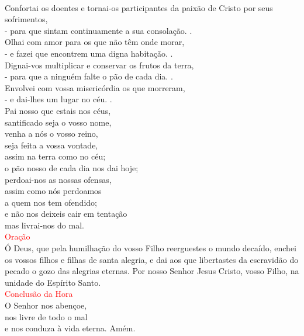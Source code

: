 \documentclass{book}
\begin{document}
\begin{center}
    \vspace{.2cm} \\
    Confortai os doentes e tornai-os participantes da paixão de Cristo por seus sofrimentos, \\
    - para que sintam continuamente a sua consolação. {\color{red} \Rbar.}
    \vspace{.2cm} \\
    Olhai com amor para os que não têm onde morar, \\
    - e fazei que encontrem uma digna habitação. {\color{red} \Rbar.}
    \vspace{.2cm} \\
    Dignai-vos multiplicar e conservar os frutos da terra, \\
    - para que a ninguém falte o pão de cada dia. {\color{red} \Rbar.}
    \vspace{.2cm} \\
    Envolvei com vossa misericórdia os que morreram, \\
    - e dai-lhes um lugar no céu. {\color{red} \Rbar.}
    \vspace{.2cm} \\
    Pai nosso que estais nos céus, \\
    santificado seja o vosso nome, \\
    venha a nós o vosso reino, \\
    seja feita a vossa vontade, \\
    assim na terra como no céu; \\
    o pão nosso de cada dia nos dai hoje; \\
    perdoai-nos as nossas ofensas, \\
    assim como nós perdoamos \\
    a quem nos tem ofendido; \\
    e não nos deixeis cair em tentação \\
    mas livrai-nos do mal.
    \vspace{.2cm} \\
    \textcolor{red}{Oração}
    \vspace{.2cm} \\
    Ó Deus, que pela humilhação do vosso Filho reerguestes o mundo decaído, enchei os vossos filhos e filhas de santa alegria, e dai aos que libertastes da escravidão do pecado o gozo das alegrias eternas. Por nosso Senhor Jesus Cristo, vosso Filho, na unidade do Espírito Santo.
    \vspace{.2cm} \\
    \textcolor{red}{Conclusão da Hora}
    \vspace{.2cm} \\
    O Senhor nos abençoe, \\
    nos livre de todo o mal \\
    e nos conduza à vida eterna. Amém.
\end{center}
\end{document}
